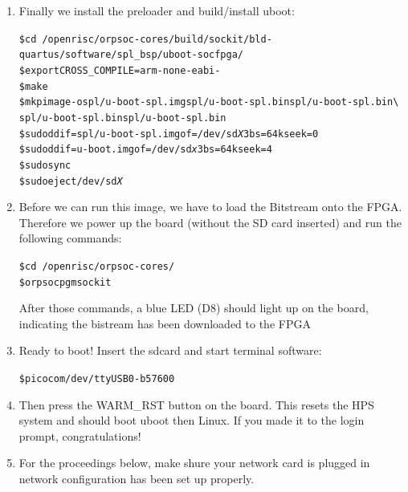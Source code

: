 \documentclass[twoside]{article}
\begin{document}
\begin{enumerate}
\item Finally we install the preloader and build/install uboot:
  \begin{alltt}
\$ cd ~/openrisc/orpsoc-cores/build/sockit/bld-quartus/software/spl_bsp/uboot-socfpga/
\$ export CROSS_COMPILE=arm-none-eabi-
\$ make
\$ mkpimage -o spl/u-boot-spl.img spl/u-boot-spl.bin spl/u-boot-spl.bin \textbackslash
               spl/u-boot-spl.bin spl/u-boot-spl.bin
\$ sudo dd if=spl/u-boot-spl.img of=/dev/sd\emph{X}3 bs=64k seek=0
\$ sudo dd if=u-boot.img of=/dev/sd\emph{x}3 bs=64k seek=4
\$ sudo sync
\$ sudo eject /dev/sd\emph{X}    
  \end{alltt}

\item Before we can run this image, we have to load the Bitstream onto
  the FPGA. Therefore we power up the board (without the SD card
  inserted) and run the following commands:
  \begin{alltt}
\$ cd ~/openrisc/orpsoc-cores/ 
\$ orpsoc pgm sockit
  \end{alltt}
  After those commands, a blue LED (D8) should light up on the board,
  indicating the bistream has been downloaded to the FPGA

\item Ready to boot! Insert the sdcard and start terminal software:
\begin{alltt}
\$ picocom /dev/ttyUSB0 -b 57600
\end{alltt}

\item Then press the WARM\_RST button on the board. This resets the HPS
  system and should boot uboot then Linux. If you made it to the login
  prompt, congratulations!

\item For the proceedings below, make shure your network card is
  plugged in network configuration has been set up properly.
\end{enumerate}
\end{document}
